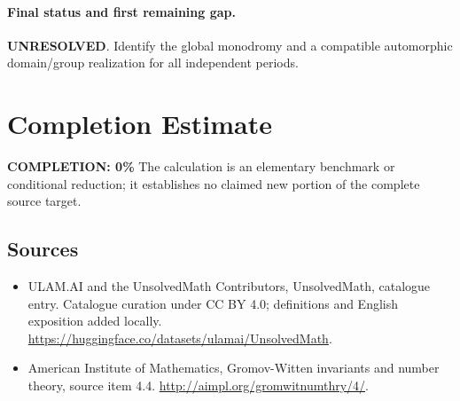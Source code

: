 \documentclass[11pt]{article}
\begin{document}
\paragraph{Final status and first remaining gap.}
\textbf{UNRESOLVED}. Identify the global monodromy and a compatible automorphic domain/group realization for all independent periods.

\section{Completion Estimate}
\noindent\textbf{COMPLETION: 0\%}
The calculation is an elementary benchmark or conditional reduction; it establishes no claimed new portion of the complete source target.

\subsection{Sources}
\begin{itemize}
\item[\hypertarget{source:statement:1}{S1}] ULAM.AI and the UnsolvedMath Contributors, UnsolvedMath, catalogue entry. Catalogue curation under CC BY 4.0; definitions and English exposition added locally.
\url{https://huggingface.co/datasets/ulamai/UnsolvedMath}.
\item[\hypertarget{source:statement:2}{S2}] American Institute of Mathematics, Gromov-Witten invariants and number theory, source item 4.4.
\url{http://aimpl.org/gromwitnumthry/4/}.
\end{itemize}
\label{end:statement}
\end{document}
